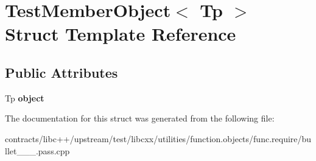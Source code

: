 \hypertarget{struct_test_member_object}{}\section{Test\+Member\+Object$<$ Tp $>$ Struct Template Reference}
\label{struct_test_member_object}
\subsection*{Public Attributes}
\begin{DoxyCompactItemize}
\item 
\mbox{\label{struct_test_member_object_a4cc2398c33de9122eb525008d81c6931}} 
Tp {\bfseries object}
\end{DoxyCompactItemize}


The documentation for this struct was generated from the following file\+:\begin{DoxyCompactItemize}
\item 
contracts/libc++/upstream/test/libcxx/utilities/function.\+objects/func.\+require/bullet\+\_\+\_\+\_.\+pass.\+cpp\end{DoxyCompactItemize}
